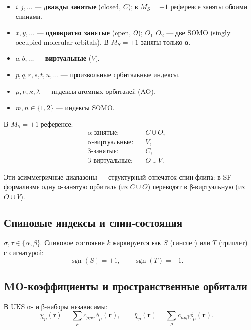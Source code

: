 \documentclass[11pt, a4paper]{article}
\theoremstyle{definition}
\newcommand{\sgn}{\operatorname{sgn}}
\begin{document}
\begin{itemize}
    \item $i, j, \ldots$ --- \textbf{дважды занятые} (closed, $C$); в $M_S = +1$ референсе заняты обоими спинами.
    \item $x, y, \ldots$ --- \textbf{однократно занятые} (open, $O$); $O_1, O_2$ --- две SOMO (singly occupied molecular orbitals). В $M_S = +1$ заняты только α.
    \item $a, b, \ldots$ --- \textbf{виртуальные} ($V$).
    \item $p, q, r, s, t, u, \ldots$ --- произвольные орбитальные индексы.
    \item $\mu, \nu, \kappa, \lambda$ --- индексы атомных орбиталей (AO).
    \item $m, n \in \{1, 2\}$ --- индексы SOMO.
\end{itemize}

В $M_S = +1$ референсе:
\begin{align}
    \text{α-занятые:} \quad &C \cup O, \\
    \text{α-виртуальные:} \quad &V, \\
    \text{β-занятые:} \quad &C, \\
    \text{β-виртуальные:} \quad &O \cup V.
\end{align}

Эти асимметричные диапазоны --- структурный отпечаток спин-флипа: в SF-формализме одну α-занятую орбиталь (из $C \cup O$) переводят в β-виртуальную (из $O \cup V$).

\subsection{Спиновые индексы и спин-состояния}

$\sigma, \tau \in \{\alpha, \beta\}$. Спиновое состояние $k$ маркируется как $S$ (синглет) или $T$ (триплет) с сигнатурой:
\begin{equation}
    \sgn(S) = +1, \qquad \sgn(T) = -1.
    \label{eq:sgn}
\end{equation}

\subsection{MO-коэффициенты и пространственные орбитали}

В UKS α- и β-наборы независимы:
\begin{equation}
    \chi_p(\mathbf r) = \sum_\mu c_{\mu p \alpha} \phi_\mu(\mathbf r), \qquad
    \bar\chi_p(\mathbf r) = \sum_\mu c_{\mu p \beta} \phi_\mu(\mathbf r).
    \label{eq:MOdef}
\end{equation}
\end{document}
